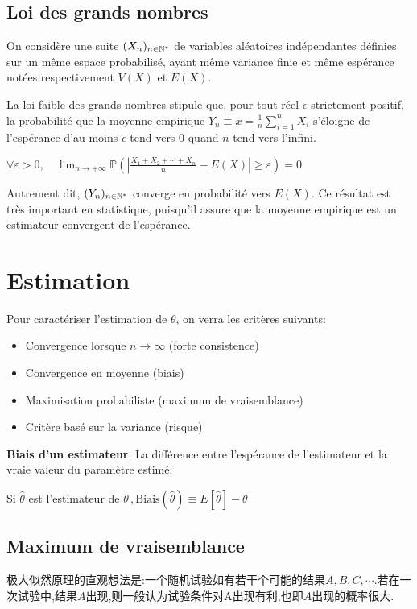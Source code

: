 \documentclass{article}
\begin{document}
\subsection{Loi des grands nombres}
On consid\`ere une suite $(X_n)_{n\in\mathbb{N}^*}$ de variables al\'eatoires ind\'ependantes d\'efinies sur un m\^eme espace probabilis\'e,
ayant m\^eme variance finie et m\^eme esp\'erance not\'ees respectivement $V(X)$ et $E(X)$.

La loi faible des grands nombres stipule que, pour tout r\'eel $\epsilon$ strictement positif, la probabilit\'e que la moyenne empirique
$Y_n \equiv \bar x= \frac{1}{n} \sum_{i=1}^{n} X_i$ s'\'eloigne de l'esp\'erance d'au moins $\epsilon$ tend vers $0$ quand $n$ tend vers l'infini.

\begin{theorem}
$\forall\varepsilon>0,\quad \lim_{n \to +\infty} \mathbb{P}\left(\left|\frac{X_1+X_2+\cdots+X_n}{n} -E(X)\right| \geqslant \varepsilon\right) = 0$
\end{theorem}

Autrement dit, $(Y_n)_{n\in\mathbb{N}^*}$ converge en probabilit\'e vers $E(X)$. Ce r\'esultat est tr\`es important en statistique,
puisqu'il assure que la moyenne empirique est un estimateur convergent de l'esp\'erance.

\section{Estimation}
Pour caract\'eriser l'estimation de $\theta$, on verra les crit\`eres suivants:
\begin{itemize}
\item Convergence lorsque $n \to \infty$ (forte consistence)
\item Convergence en moyenne (biais)
\item Maximisation probabiliste (maximum de vraisemblance)
\item Crit\`ere bas\'e sur la variance (risque)
\end{itemize}

\begin{definition}
\textbf{Biais d'un estimateur}:
La diff\'erence entre l'esp\'erance de l'estimateur et la vraie valeur du param\`etre estim\'e.

Si $\hat \theta$ est l'estimateur de $\theta\,,  \text{Biais}(\hat\theta)\equiv E[\hat\theta]-\theta$
\end{definition}

\subsection{Maximum de vraisemblance}
极大似然原理的直观想法是:一个随机试验如有若干个可能的结果$A,B,C,\cdots$.若在一次试验中,结果$A$出现,则一般认为试验条件对A出现有利,也即$A$出现的概率很大.
\end{document}
